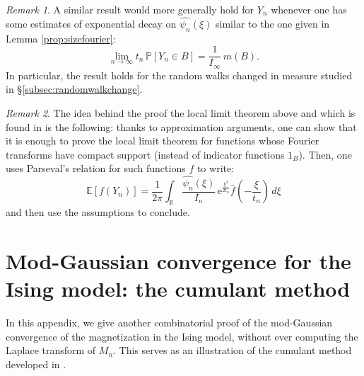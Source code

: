 \documentclass[12pt,a4paper,reqno]{amsart}
\newcommand{\R}{\mathbb{R}}
\newcommand{\E}{\mathrm{e}}
\newcommand{\esper}{\mathbb{E}}
\newcommand{\proba}{\mathbb{P}}
\theoremstyle{remark}
\newtheorem*{remark}{Remark}
\begin{document}
\begin{remark}
A similar result would more generally hold for $Y_n$ whenever one has some estimates of exponential decay on $\widehat{\psi_n}(\xi)$ similar to the one given in Lemma \ref{prop:sizefourier}:
$$\lim_{n\to\infty} t_n \,\proba[Y_n\in B]=\frac{1}{I_\infty}\,  m(B).$$
In particular, the result holds for the random walks changed in measure studied in \S\ref{subsec:randomwalkchange}.
\end{remark}

\begin{remark}
The idea behind the proof the local limit theorem above and which is found in \cite{DKN11} is the following: thanks to approximation arguments, one can show that it is enough to prove the local limit theorem for functions whose Fourier transforms have compact support (instead of indicator functions $1_B$). Then, one uses Parseval's relation for such functions $f$ to write:
$$\esper[f(Y_n)]=\frac{1}{2\pi}\int_\R \frac{\widehat{\psi_n}(\xi)}{I_n}\, \E^{\frac{\xi^2}{2t_n}} \widehat{f}\left(-\frac{\xi}{t_n}\right)\, d\xi $$
and then use the assumptions to conclude.
\end{remark}
\bigskip
\bigskip
















\section{Mod-Gaussian convergence for the Ising model: the cumulant method}\label{sec:cumulantspin}
In this appendix, we give another combinatorial proof of the mod-Gaussian convergence of the magnetization in the Ising model, without ever computing the Laplace transform of $M_n$. This serves as an illustration of the cumulant method developed in \cite{FMN13}.
\medskip
\end{document}
